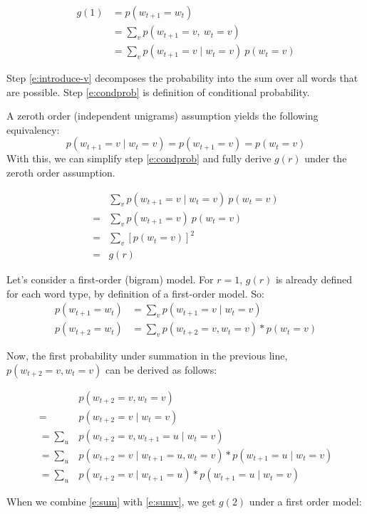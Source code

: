 \documentclass[11pt,letterpaper]{article}
\theoremstyle{definition}
\begin{document}
\begin{align}
g(1) &= p(w_{t+1}=w_{t}) \\
&= \sum_v p(w_{t+1}=v,\ w_{t}=v)  \label{e:introduce-v} \\
&= \sum_v p(w_{t+1}=v \mid w_t=v)\ p(w_t=v) \label{e:condprob}
\end{align}

Step \ref{e:introduce-v} decomposes the probability into the sum over all words that are possible.  Step \ref{e:condprob} is definition of conditional probability.


A zeroth order (independent unigrams) assumption yields the following equivalency:
\[p(w_{t+1}=v \mid w_t=v) = p(w_{t+1}=v) = p(w_{t}=v)\]
With this, we can simplify step \ref{e:condprob} and fully derive $g(r)$ under the zeroth order assumption.

\begin{align}
&\sum_v p(w_{t+1}=v \mid w_t=v)\ p(w_t=v) \\
= &\sum_v p(w_{t+1}=v)\ p(w_t=v)\\
= &\sum_v [p(w_{t}=v)]^2  \\
= &g(r) 
\end{align}

Let's consider a first-order (bigram) model. For $r=1$, $g(r)$ is already defined for each word type, by definition of a first-order model. So:
\begin{align}
p(w_{t+1} = w_{t}) &=  \sum_v p(w_{t+1} = v \mid w_{t} = v)\\
p(w_{t+2} = w_{t}) &=  \sum_v p(w_{t+2} = v , w_{t} = v) * p(w_{t} = v) \label{e:sumv}
\end{align}

 Now, the first probability under summation in the previous line, $p(w_{t+2} = v , w_{t} = v)$ can be derived as follows:

\begin{align}
  &p(w_{t+2} = v , w_{t} = v)\\
= &p(w_{t+2} = v  \mid w_{t} = v)\\
= \sum_u &p(w_{t+2} = v , w_{t+1} = u \mid w_{t} = v)\\
= \sum_u &p(w_{t+2} = v \mid w_{t+1} = u , w_{t} = v) * p(w_{t+1} = u \mid w_{t} = v)\\
= \sum_u &p(w_{t+2} = v \mid w_{t+1} = u ) * p(w_{t+1} = u \mid w_{t} = v) \label{e:sumu}
\end{align}

When we combine \ref{e:sum} with \ref{e:sumv}, we get $g(2)$ under a first order model:
\end{document}
